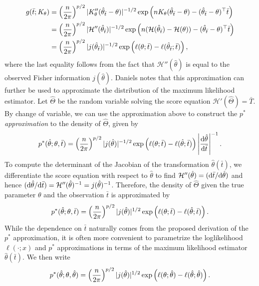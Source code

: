 \begin{align*}
    g(\bar t; K_\theta) 
    &= \left(\frac{n}{2\pi}\right)^{p/2}|K_\theta''(\hat\theta_{\bar t} - \theta)|^{-1/2} \exp\left(nK_\theta(\hat\theta_{\bar t} - \theta) - (\hat\theta_{\bar t} - \theta)^\top \bar t\right)\\
    &= \left(\frac{n}{2\pi}\right)^{p/2}|\mathcal{H}''(\hat\theta_{\bar t})|^{-1/2} \exp\left(n(\mathcal{H}(\hat\theta_{\bar t}) - \mathcal{H}(\theta)) - (\hat\theta_{\bar t} - \theta)^\top \bar t\right)\\
    &= \left(\frac{n}{2\pi}\right)^{p/2}|j(\hat\theta_{\bar t})|^{-1/2} \exp\left(\ell(\theta; \bar t) - \ell(\hat\theta_{\bar t}; \bar t)\right),
\end{align*}
where the last equality follows from the fact that $\mathcal{H}''(\hat\theta)$ is equal to the observed Fisher information $j(\hat\theta)$. Daniels \cite{daniels1958} notes that this approximation can further be used to approximate the distribution of the maximum likelihood estimator. Let $\hat\Theta$ be the random variable solving the score equation $\mathcal{H}'(\hat\Theta) = \bar T$. By change of variable, we can use the approximation above to construct  the \textit{$p^*$ approximation} to the density of $\hat\Theta$, given by
\begin{equation*}
    p^*(\hat\theta; \theta, \bar t) = \left(\frac{n}{2\pi}\right)^{p/2}|j(\hat\theta)|^{-1/2} \exp\left(\ell(\theta; \bar t) - \ell(\hat\theta; \bar t)\right) \left|\frac{\text{d} \hat\theta}{\text{d} \bar t}\right|^{-1}.
\end{equation*}
To compute the determinant of the Jacobian of the transformation $\hat\theta(\bar t)$, we  differentiate the score equation with respect to $\hat\theta$ to find $\mathcal{H}''(\hat\theta) = (\text{d} \bar t / \text{d} \hat\theta)$ and hence $(\text{d} \hat\theta / \text{d} \bar t) = \mathcal{H}''(\hat\theta)^{-1} = j(\hat\theta)^{-1}$. Therefore, the density of $\hat\Theta$ given the true parameter $\theta$ and the observation $\bar t$ is approximated by
\begin{equation} \label{eq-pstar}
    p^*(\hat\theta; \theta, \bar t) = \left(\frac{n}{2\pi}\right)^{p/2}|j(\hat\theta)|^{1/2} \exp\left(\ell(\theta; \bar t) - \ell(\hat\theta; \bar t)\right).
\end{equation}
While the dependence on $\bar t$ naturally comes from the proposed derivation of the $p^*$ approximation, it is often more convenient to parametrize the loglikelihood $\ell(\cdot; x)$ and $p^*$ approximations in terms of the maximum likelihood estimator $\hat\theta(\bar t)$. We then write
\begin{equation*}
    p^*(\hat\theta; \theta, \hat\theta) = \left(\frac{n}{2\pi}\right)^{p/2}|j(\hat\theta)|^{1/2} \exp\left(\ell(\theta; \hat\theta) - \ell(\hat\theta; \hat\theta)\right).
\end{equation*}
